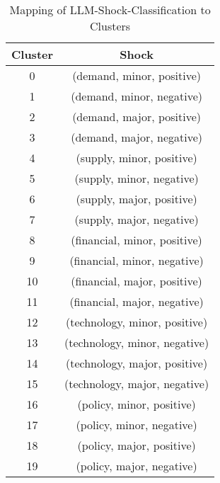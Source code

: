 \begin{table}[h!]
\centering
\begin{tabular}{|c|c|}
\hline
\rowcolor{gray!10}
\textbf{Cluster} & \textbf{Shock} \\ \hline \hline 
0 & {(demand, minor, positive)} \\ \hline
1 & {(demand, minor, negative)} \\ \hline
2 & {(demand, major, positive)} \\ \hline
3 & {(demand, major, negative)} \\ \hline
\hline
4 & {(supply, minor, positive)} \\ \hline
5 & {(supply, minor, negative)} \\ \hline
6 & {(supply, major, positive)} \\ \hline
7 & {(supply, major, negative)} \\ \hline
\hline
8 & {(financial, minor, positive)} \\ \hline
9 & {(financial, minor, negative)} \\ \hline
10 & {(financial, major, positive)} \\ \hline
11 & {(financial, major, negative)} \\ \hline
\hline
12 & {(technology, minor, positive)} \\ \hline
13 & {(technology, minor, negative)} \\ \hline
14 & {(technology, major, positive)} \\ \hline
15 & {(technology, major, negative)} \\ \hline
\hline
16 & {(policy, minor, positive)} \\ \hline
17 & {(policy, minor, negative)} \\ \hline
18 & {(policy, major, positive)} \\ \hline
19 & {(policy, major, negative)} \\ \hline
\hline
\end{tabular}
\caption{Mapping of LLM-Shock-Classification to Clusters}
\label{tab:LLM_cluster_mapping}
\end{table}